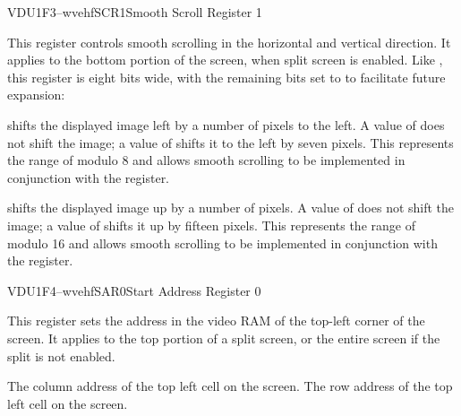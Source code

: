 \begin{ioport}{VDU}{1F3}{--wvehf}{SCR1}{Smooth Scroll Register 1}

  This register controls smooth scrolling in the horizontal and vertical
  direction. It applies to the bottom portion of the screen, when split screen
  is enabled. Like , this register is eight bits wide, with the
  remaining bits set to  to facilitate future expansion:

  \begin{cbitfield}[8]
  \end{cbitfield}

  \begin{description}
     shifts the displayed image left by a number of
    pixels to the left. A value of  does not shift the image; a value of
     shifts it to the left by seven pixels. This represents the range of
    modulo 8 and allows smooth scrolling to be implemented in conjunction with
    the  register.

     shifts the displayed image up by a number of pixels. A
    value of  does not shift the image; a value of  shifts it up
    by fifteen pixels. This represents the range of modulo 16 and allows smooth
    scrolling to be implemented in conjunction with the  register.
  \end{description}

\end{ioport}





\begin{ioport}{VDU}{1F4}{--wvehf}{SAR0}{Start Address Register 0}

  This register sets the address in the video RAM of the top-left corner of the
  screen. It applies to the top portion of a split screen, or the entire screen
  if the split is not enabled.

  \begin{cbitfield}[8]
  \end{cbitfield}

  \begin{description}
   The column address of the top left cell on the screen.
   The row address of the top left cell on the screen.
  \end{description}

\end{ioport}






